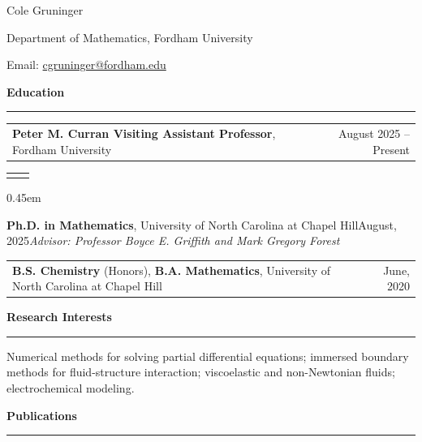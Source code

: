 \documentclass[10pt]{article}
\makeatletter
\newcommand{\namestyle}[1]{%
  {\fontsize{20}{22}\selectfont #1\par}
}
\newcommand{\contactline}[1]{%
  {#1\par}
}
\newcommand{\cvsection}[1]{%
  \vspace{0.8em}%
  {\large\bfseries #1\par}%
  \vspace{0.25em}%
  \hrule
  \vspace{0.3em}%
}
\newcommand{\datedentry}[3]{%
  \begin{tabular*}{\textwidth}{@{\extracolsep{\fill}}p{0.78\textwidth}r@{}}
    #1 & #2 \\
  \end{tabular*}
  #3\par
  \vspace{0.45em}
}
\newcommand{\simpledatedentry}[2]{%
  \begin{tabular*}{\textwidth}{@{\extracolsep{\fill}}p{0.82\textwidth}r@{}}
    #1 & #2 \\
  \end{tabular*}
}
\makeatother
\begin{document}
\begin{center}
\namestyle{Cole Gruninger}
\contactline{Department of Mathematics, Fordham University}
\contactline{Email: \href{mailto:cgruninger@fordham.edu}{cgruninger@fordham.edu}}
\end{center}

\cvsection{Education}

\datedentry{\textbf{Peter M. Curran Visiting Assistant Professor}, Fordham University}{August 2025 -- Present}

\datedentry{\textbf{Ph.D. in Mathematics}, University of North Carolina at Chapel Hill}{August, 2025}{\textit{Advisor: Professor Boyce E. Griffith and Mark Gregory Forest}}

\simpledatedentry{\textbf{B.S. Chemistry} (Honors), \textbf{B.A. Mathematics}, University of North Carolina at Chapel Hill}{June, 2020}

\cvsection{Research Interests}

Numerical methods for solving partial differential equations; immersed boundary methods for fluid-structure interaction; viscoelastic and non-Newtonian fluids; electrochemical modeling.

\cvsection{Publications}
\end{document}

